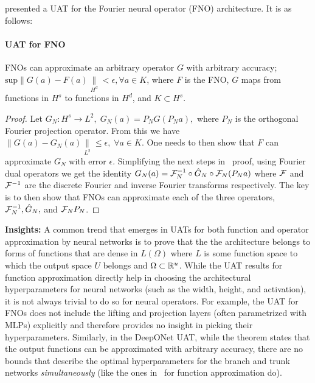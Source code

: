 \citep{kovachki2021universal} presented a UAT for the Fourier neural operator (FNO) architecture. It is as follows:
\paragraph{UAT for FNO}
\begin{theorem}
FNOs can approximate an arbitrary operator $G$ with arbitrary accuracy; $\text{sup} \|G(a) - F(a)\|\limits_{H^d} < \epsilon, \forall a \in K$, where $F$ is the FNO, $G$ maps from functions in $H^s$ to functions in $H^d$, and $K \subset H^s$.
\begin{proof}
Let $G_N: H^s \rightarrow L^2, \; G_N(a) = P_N G(P_N a),$ where $P_N$ is the orthogonal Fourier projection operator. From this we have $\|G(a) - G_N(a)\|\limits_{L^2} \le \epsilon, \; \forall a \in K$. One needs to then show that $F$ can approximate $G_N$ with error $\epsilon$. Simplifying the next steps in~\citep{kovachki2021universal} proof, using Fourier dual operators we get the identity $G_N(a) = \mathcal{F}_N^{-1} \circ \hat{G}_N \circ \mathcal{F}_N (P_N a)$ where $\mathcal{F}$ and $\mathcal{F}^{-1}$ are the discrete Fourier and inverse Fourier transforms respectively. The key is to then show that FNOs can approximate each of the three operators, $\mathcal{F}_N^{-1}, \hat{G}_N,$ and $\mathcal{F}_N P_N$.
\end{proof}
\end{theorem}
{\bf Insights:} A common trend that emerges in UATs for both function and operator approximation by neural networks is to prove that the the architecture belongs to forms of functions that are dense in $L(\Omega)$ where $L$ is some function space to which the output space $U$ belongs and $\Omega \subset \mathbb{R}^u$. While the UAT results for function approximation directly help in choosing the architectural hyperparameters for neural networks (such as the width, height, and activation), it is not always trivial to do so for neural operators. For example, the UAT for FNOs does not include the lifting and projection layers (often parametrized with MLPs) explicitly and therefore provides no insight in picking their hyperparameters. Similarly, in the DeepONet UAT, while the theorem states that the output functions can be approximated with arbitrary accuracy, there are no bounds that describe the optimal hyperparameters for the branch and trunk networks \emph{simultaneously} (like the ones in~\cite{lu2017expressive, park2020minimum} for function approximation do).

